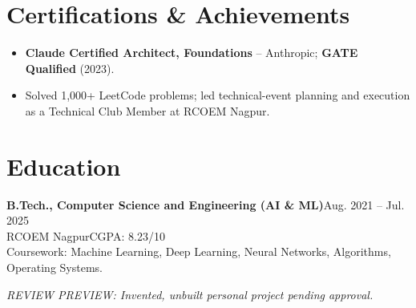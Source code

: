 \documentclass[a4paper,10pt]{article}
\begin{document}
\section{Certifications \& Achievements}
\begin{itemize}
\item \textbf{Claude Certified Architect, Foundations} -- Anthropic; \textbf{GATE Qualified} (2023).
\item Solved 1,000+ LeetCode problems; led technical-event planning and execution as a Technical Club Member at RCOEM Nagpur.
\end{itemize}

\section{Education}
\textbf{B.Tech., Computer Science and Engineering (AI \& ML)}\hfill Aug. 2021 -- Jul. 2025\\
RCOEM Nagpur\hfill CGPA: 8.23/10\\
Coursework: Machine Learning, Deep Learning, Neural Networks, Algorithms, Operating Systems.

\vfill
{\textit{REVIEW PREVIEW: Invented, unbuilt personal project pending approval.}}
\end{document}
